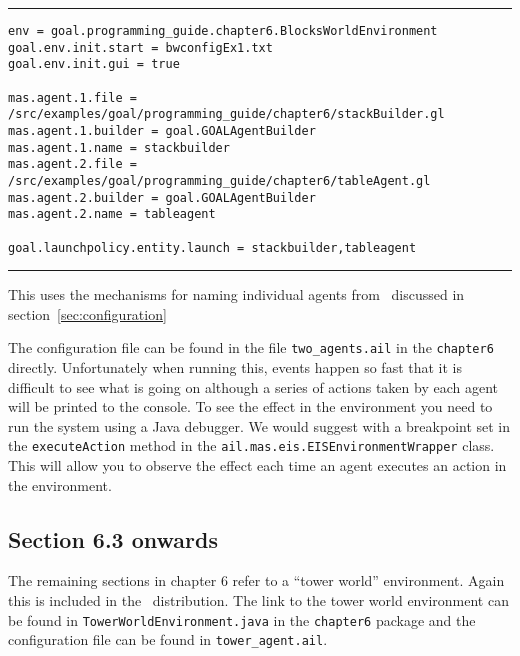 \noindent\rule{\textwidth}{1pt}
\begin{small}
\begin{verbatim}
env = goal.programming_guide.chapter6.BlocksWorldEnvironment
goal.env.init.start = bwconfigEx1.txt
goal.env.init.gui = true

mas.agent.1.file = /src/examples/goal/programming_guide/chapter6/stackBuilder.gl
mas.agent.1.builder = goal.GOALAgentBuilder
mas.agent.1.name = stackbuilder
mas.agent.2.file = /src/examples/goal/programming_guide/chapter6/tableAgent.gl
mas.agent.2.builder = goal.GOALAgentBuilder
mas.agent.2.name = tableagent

goal.launchpolicy.entity.launch = stackbuilder,tableagent
\end{verbatim}
\end{small}
\rule{\textwidth}{1pt}

This uses the mechanisms for naming individual agents from \ail\ discussed in section~\ref{sec:configuration}

\begin{sloppypar}
  The configuration file can be found in the file \texttt{two\_agents.ail} in the \texttt{chapter6} directly.  Unfortunately when running this, events happen so fast that it is difficult to see what is going on although a series of actions taken by each agent will be printed to the console.  To see the effect in the environment you need to run the system using a Java debugger.  We would suggest with a breakpoint set in the \texttt{executeAction} method in the \texttt{ail.mas.eis.EISEnvironmentWrapper} class.  This will allow you to observe the effect each time an agent executes an action in the environment.
  \end{sloppypar}

\subsection{Section 6.3 onwards}

The remaining sections in chapter 6 refer to a ``tower world'' environment.  Again this is included in the \ail\ distribution.  The link to the tower world environment can be found in \texttt{TowerWorldEnvironment.java} in the \texttt{chapter6} package and the configuration file can be found in \texttt{tower\_agent.ail}.

